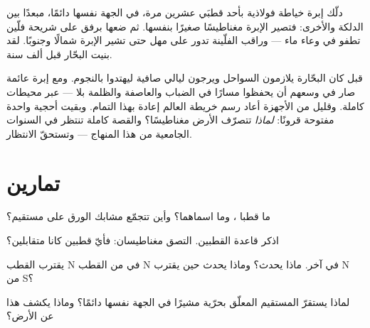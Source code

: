 \begin{example}\label{ex:g4:magnets-and-compass:make}
دلّك إبرة خياطة فولاذية بأحد قطبَي  عشرين مرة، في الجهة
نفسها دائمًا، مبعدًا  بين الدلكة والأخرى: فتصير الإبرة
مغناطيسًا صغيرًا بنفسها. ثم ضعها برفق على شريحة فلّين تطفو في
وعاء ماء --- وراقب الفلّينة تدور على مهل حتى تشير الإبرة شمالًا
وجنوبًا. لقد بنيت  البحّار قبل ألف سنة.
\end{example}

\begin{remark}\label{rem:g4:magnets-and-compass:history}
قبل  كان البحّارة يلازمون السواحل ويرجون ليالي صافية
ليهتدوا بالنجوم. ومع إبرة عائمة صار في وسعهم أن يحفظوا مسارًا
في الضباب والعاصفة والظلمة بلا  --- عبر محيطات كاملة. وقليل
من الأجهزة أعاد رسم خريطة العالم إعادة بهذا التمام. وبقيت أحجية
واحدة مفتوحة قرونًا: \emph{لماذا} تتصرّف الأرض مغناطيسًا؟
والقصة كاملة تنتظر في السنوات الجامعية من هذا المنهاج ---
وتستحقّ الانتظار.
\end{remark}

\section{تمارين}

\begin{exercise}[$\star$]\label{exo:g4:magnets-and-compass:1}
ما قطبا ، وما اسماهما؟ وأين تتجمّع مشابك الورق على
 مستقيم؟
\end{exercise}

\begin{exercise}[$\star$]\label{exo:g4:magnets-and-compass:2}
اذكر قاعدة القطبين. التصق مغناطيسان: فأيّ قطبين كانا متقابلين؟
\end{exercise}

\begin{exercise}[$\star$]\label{exo:g4:magnets-and-compass:3}
يقترب القطب N في  من القطب N في آخر. ماذا يحدث؟ وماذا
يحدث حين يقترب N من S؟
\end{exercise}

\begin{exercise}[$\star$]\label{exo:g4:magnets-and-compass:4}
لماذا يستقرّ  المستقيم المعلّق بحرّية مشيرًا في الجهة
نفسها دائمًا؟ وماذا يكشف هذا عن الأرض؟
\end{exercise}

